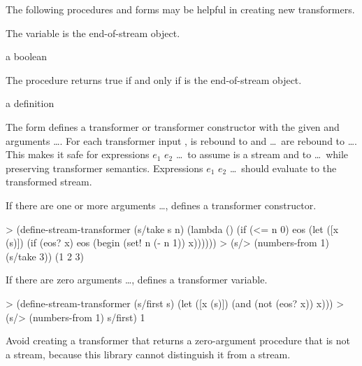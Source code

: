 The following procedures and forms may be helpful in creating new transformers.

\begin{variable}
\end{variable}
\antipar

The  variable is the end-of-stream object.

\begin{procedure}
\end{procedure}
\returns{} a boolean

The  procedure returns true if and only if  is the end-of-stream object.

\begin{syntax}
\end{syntax}
\expandsto{} a definition

The  form defines a transformer or transformer constructor
with the given  and arguments  \ldots. For each transformer input
,  is rebound to  and  \ldots\ are
rebound to  \ldots. This makes it safe for expressions $e_1$ $e_2$ \ldots\ to
assume  is a stream and to   \ldots\ while preserving transformer
semantics. Expressions $e_1$ $e_2$ \ldots\ should evaluate to the transformed stream.

If there are one or more arguments  \ldots, 
defines a transformer constructor.

\codebegin
> (define-stream-transformer (s/take s n)
    (lambda ()
      (if (<= n 0)
          eos
          (let ([x (s)])
            (if (eos? x)
                eos
                (begin
                  (set! n (- n 1))
                  x))))))
> (s/> (numbers-from 1) (s/take 3))
(1 2 3)
\codeend

If there are zero arguments  \ldots,  defines a
transformer variable.

\codebegin
> (define-stream-transformer (s/first s)
    (let ([x (s)])
      (and (not (eos? x)) x)))
> (s/> (numbers-from 1) s/first)
1
\codeend

Avoid creating a transformer that returns a zero-argument procedure that is not a stream,
because this library cannot distinguish it from a stream.

